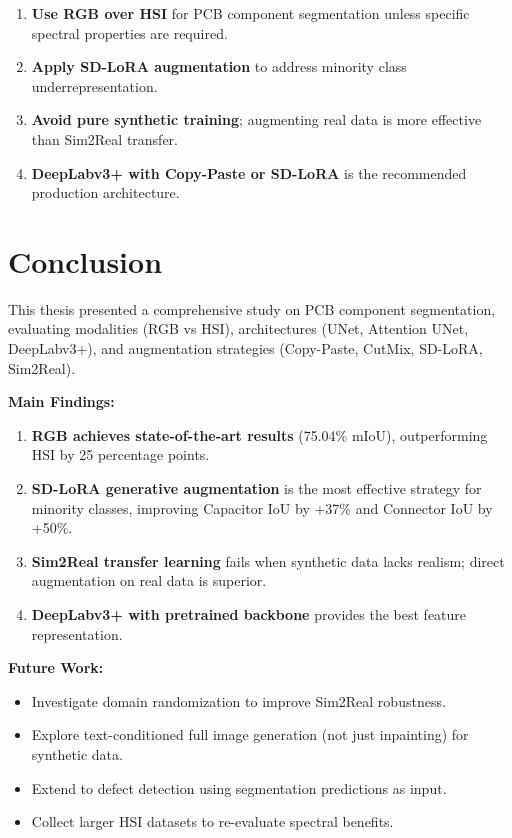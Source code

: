 \documentclass[12pt,a4paper]{article}
\begin{document}
\begin{enumerate}
    \item \textbf{Use RGB over HSI} for PCB component segmentation unless specific spectral properties are required.
    \item \textbf{Apply SD-LoRA augmentation} to address minority class underrepresentation.
    \item \textbf{Avoid pure synthetic training}; augmenting real data is more effective than Sim2Real transfer.
    \item \textbf{DeepLabv3+ with Copy-Paste or SD-LoRA} is the recommended production architecture.
\end{enumerate}

\section{Conclusion}

This thesis presented a comprehensive study on PCB component segmentation, evaluating modalities (RGB vs HSI), architectures (UNet, Attention UNet, DeepLabv3+), and augmentation strategies (Copy-Paste, CutMix, SD-LoRA, Sim2Real).

\textbf{Main Findings:}
\begin{enumerate}
    \item \textbf{RGB achieves state-of-the-art results} (75.04\% mIoU), outperforming HSI by 25 percentage points.
    \item \textbf{SD-LoRA generative augmentation} is the most effective strategy for minority classes, improving Capacitor IoU by +37\% and Connector IoU by +50\%.
    \item \textbf{Sim2Real transfer learning} fails when synthetic data lacks realism; direct augmentation on real data is superior.
    \item \textbf{DeepLabv3+ with pretrained backbone} provides the best feature representation.
\end{enumerate}

\textbf{Future Work:}
\begin{itemize}
    \item Investigate domain randomization to improve Sim2Real robustness.
    \item Explore text-conditioned full image generation (not just inpainting) for synthetic data.
    \item Extend to defect detection using segmentation predictions as input.
    \item Collect larger HSI datasets to re-evaluate spectral benefits.
\end{itemize}
\end{document}
